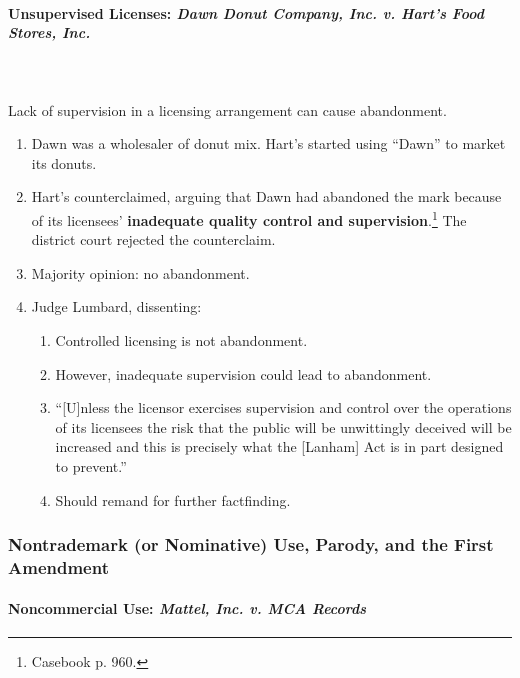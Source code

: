 \paragraph{Unsupervised Licenses: \emph{Dawn Donut Company, Inc. v. Hart's 
Food Stores, Inc.}}
~\\\\
Lack of supervision in a licensing arrangement can cause abandonment.

\begin{enumerate}
    \item Dawn was a wholesaler of donut mix. Hart's started using ``Dawn'' to 
    market its donuts.
    \item Hart's counterclaimed, arguing that Dawn had abandoned the mark 
    because of its licensees' \textbf{inadequate quality control and 
    supervision}.\footnote{Casebook p. 960.} The district court rejected the 
    counterclaim.
    \item Majority opinion: no abandonment.
    \item Judge Lumbard, dissenting:
    \begin{enumerate}
        \item Controlled licensing is not abandonment.
        \item However, inadequate supervision could lead to abandonment. 
        \item ``[U]nless the licensor exercises supervision and control over 
        the operations of its licensees the risk that the public will be 
        unwittingly deceived will be increased and this is precisely what the 
        [Lanham] Act is in part designed to prevent.''
        \item Should remand for further factfinding.
    \end{enumerate}
\end{enumerate}

\subsubsection{Nontrademark (or Nominative) Use, Parody, and the First 
Amendment}

\paragraph{Noncommercial Use: \emph{Mattel, Inc. v. MCA Records}}

